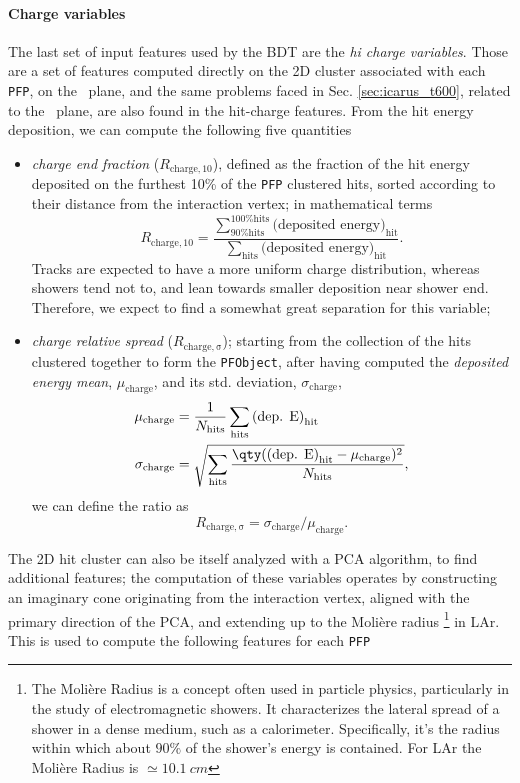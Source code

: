 \paragraph*{Charge variables} The last set of input features used by the BDT are the \emph{hi charge variables}. Those are a set of features computed directly on the 2D cluster associated with each \texttt{PFP}, on the \ind\ plane, and the same problems faced in Sec. \ref{sec:icarus_t600}, related to the \ind\ plane, are also found in the hit-charge features. From the hit energy deposition, we can compute the following five quantities\begin{itemize}
    \item \emph{charge end fraction} ($R_\mathrm{charge, 10}$), defined as the fraction of the hit energy deposited on the furthest 10\% of the \texttt{PFP} clustered hits, sorted according to their distance from the interaction vertex; in mathematical terms \begin{equation*}
        R_\mathrm{charge, 10} = \frac{\sum_\text{90\% hits}^\text{100\% hits}\text{(deposited energy)}_\text{hit}}{\sum_\text{hits}\text{(deposited energy)}_\text{hit}}. 
    \end{equation*} Tracks are expected to have a more uniform charge distribution, whereas showers tend not to, and lean towards smaller deposition near shower end. Therefore, we expect to find a somewhat great separation for this variable;
    \item \emph{charge relative spread} ($R_\mathrm{charge, \sigma}$); starting from the collection of the hits clustered together to form the \texttt{PFObject}, after having computed the \emph{deposited energy mean}, $\mu_\text{charge}$, and its std. deviation, $\sigma_\text{charge}$, \begin{equation*}
        \begin{aligned}
            \mu_\text{charge} &= \frac1{N_\text{hits}}\sum_\text{hits} \text{(dep. E)}_\text{hit}\\
            \sigma_\text{charge} &= \sqrt{\sum_\text{hits} \frac{\qty(\text{(dep. E)}_\text{hit} - \mu_\text{charge})^2}{N_\text{hits}}},
        \end{aligned} 
    \end{equation*} we can define the ratio as \[R_\mathrm{charge, \sigma} = \sigma_\text{charge}/\mu_\text{charge}.\]
\end{itemize} The 2D hit cluster can also be itself analyzed with a PCA algorithm, to find additional features; the computation of these variables operates by constructing an imaginary cone originating from the interaction vertex, aligned with the primary direction of the PCA, and extending up to the Molière radius \footnote{The Molière Radius is a concept often used in particle physics, particularly in the study of electromagnetic showers. It characterizes the lateral spread of a shower in a dense medium, such as a calorimeter. Specifically, it’s the radius within which about $90\%$ of the shower’s energy is contained. For LAr the Molière Radius is $\simeq\SI{10.1}{cm}$} in LAr. This is used to compute the following features for each \texttt{PFP}\begin{itemize}

\end{itemize}
